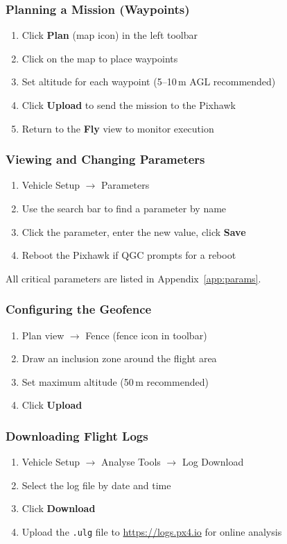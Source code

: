 \documentclass{article}
\begin{document}
\subsubsection{Planning a Mission (Waypoints)}
\begin{enumerate}
    \item Click \textbf{Plan} (map icon) in the left toolbar
    \item Click on the map to place waypoints
    \item Set altitude for each waypoint (5--10\,m AGL recommended)
    \item Click \textbf{Upload} to send the mission to the Pixhawk
    \item Return to the \textbf{Fly} view to monitor execution
\end{enumerate}

\subsubsection{Viewing and Changing Parameters}
\begin{enumerate}
    \item Vehicle Setup $\rightarrow$ Parameters
    \item Use the search bar to find a parameter by name
    \item Click the parameter, enter the new value, click \textbf{Save}
    \item Reboot the Pixhawk if QGC prompts for a reboot
\end{enumerate}

All critical parameters are listed in Appendix~\ref{app:params}.

\subsubsection{Configuring the Geofence}
\begin{enumerate}
    \item Plan view $\rightarrow$ Fence (fence icon in toolbar)
    \item Draw an inclusion zone around the flight area
    \item Set maximum altitude (50\,m recommended)
    \item Click \textbf{Upload}
\end{enumerate}

\subsubsection{Downloading Flight Logs}
\begin{enumerate}
    \item Vehicle Setup $\rightarrow$ Analyse Tools $\rightarrow$ Log Download
    \item Select the log file by date and time
    \item Click \textbf{Download}
    \item Upload the \texttt{.ulg} file to \url{https://logs.px4.io} for online analysis
\end{enumerate}
\end{document}
